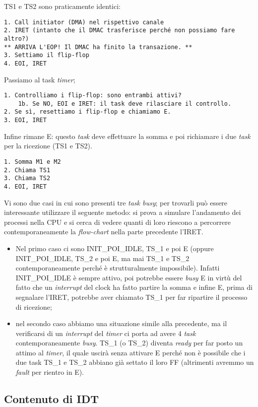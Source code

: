 TS1 e TS2 sono praticamente identici:
\begin{verbatim}
1. Call initiator (DMA) nel rispettivo canale
2. IRET (intanto che il DMAC trasferisce perché non possiamo fare altro?)
** ARRIVA L'EOP! Il DMAC ha finito la transazione. **
3. Settiamo il flip-flop
4. EOI, IRET
\end{verbatim}

Passiamo al task \textit{timer};
\begin{verbatim}
1. Controlliamo i flip-flop: sono entrambi attivi? 
	1b. Se NO, EOI e IRET: il task deve rilasciare il controllo.
2. Se sì, resettiamo i flip-flop e chiamiamo E.
3. EOI, IRET
\end{verbatim}

Infine rimane E: questo \textit{task} deve effettuare la somma e poi richiamare i due \textit{task} per la ricezione (TS1 e TS2).
\begin{verbatim}
1. Somma M1 e M2
2. Chiama TS1
3. Chiama TS2
4. EOI, IRET
\end{verbatim}

Vi sono due casi in cui sono presenti tre \textit{task busy}; per trovarli può essere interessante utilizzare il seguente metodo: si prova a simulare l'andamento dei processi nella CPU e si cerca di vedere quanti di loro riescono a percorrere contemporaneamente la \textit{flow-chart} nella parte precedente l'IRET.
\begin{itemize}
\item Nel primo caso ci sono INIT\_POI\_IDLE, TS\_1 e poi E (oppure INIT\_POI\_IDLE, TS\_2 e poi E, ma mai TS\_1 e TS\_2 contemporaneamente perché è strutturalmente impossibile). 
Infatti INIT\_POI\_IDLE è sempre attivo, poi potrebbe essere \textit{busy} E in virtù del fatto che un \textit{interrupt} del clock ha fatto partire la somma e infine E, prima di segnalare l'IRET, potrebbe aver chiamato TS\_1 per far ripartire il processo di ricezione;
\item nel secondo caso abbiamo una situazione simile alla precedente, ma il verificarsi di un \textit{interrupt} del \textit{timer} ci porta ad avere 4 \textit{task} contemporaneamente \textit{busy}. TS\_1 (o TS\_2) diventa \textit{ready} per far posto un attimo al \textit{timer}, il quale uscirà senza attivare E perché non è possibile che i due task TS\_1 e TS\_2 abbiano già settato il loro FF (altrimenti avremmo un \textit{fault} per rientro in E).
\end{itemize}

\subsection{Contenuto di IDT}

